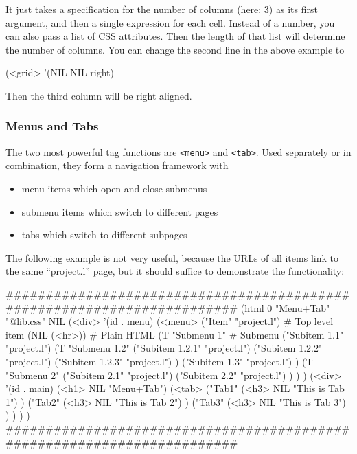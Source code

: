 It just takes a specification for the number of columns (here: 3) as its
first argument, and then a single expression for each cell. Instead of a
number, you can also pass a list of CSS attributes. Then the length of
that list will determine the number of columns. You can change the
second line in the above example to


\begin{wideverbatim}
(<grid> '(NIL NIL right)
\end{wideverbatim}

Then the third column will be right aligned.

\subsubsection{ Menus and Tabs}
\label{sec:appl-devel-menus-and-tabs}%

The two most powerful tag functions are \texttt{<menu>} and \texttt{<tab>}. Used
separately or in combination, they form a navigation framework with

\begin{itemize}
\item menu items which open and close submenus
\item submenu items which switch to different pages
\item tabs which switch to different subpages
\end{itemize}

The following example is not very useful, because the URLs of all items
link to the same ``project.l'' page, but it should suffice to demonstrate
the functionality:


\begin{wideverbatim}
########################################################################
(html 0 "Menu+Tab" "@lib.css" NIL
   (<div> '(id . menu)
      (<menu>
         ("Item" "project.l")                      # Top level item
         (NIL (<hr>))                              # Plain HTML
         (T "Submenu 1"                            # Submenu
            ("Subitem 1.1" "project.l")
            (T "Submenu 1.2"
               ("Subitem 1.2.1" "project.l")
               ("Subitem 1.2.2" "project.l")
               ("Subitem 1.2.3" "project.l") )
            ("Subitem 1.3" "project.l") )
         (T "Submenu 2"
            ("Subitem 2.1" "project.l")
            ("Subitem 2.2" "project.l") ) ) )
   (<div> '(id . main)
      (<h1> NIL "Menu+Tab")
      (<tab>
         ("Tab1"
            (<h3> NIL "This is Tab 1") )
         ("Tab2"
            (<h3> NIL "This is Tab 2") )
         ("Tab3"
            (<h3> NIL "This is Tab 3") ) ) ) )
########################################################################
\end{wideverbatim}

